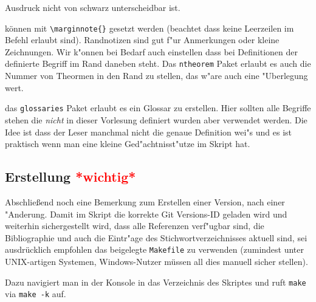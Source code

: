 \documentclass[paper=A4, twoside, chapterprefix=true, bibliography=totoc, headsepline]{scrbook}
\begin{document}
\begin{description}[font=\normalfont\itshape]
    Ausdruck nicht von schwarz unterscheidbar ist.
  \item[Randnotizen:] können mit \verb|\marginnote{}| gesetzt werden
    (beachtet dass keine Leerzeilen im Befehl erlaubt
    sind). Randnotizen sind gut f"ur Anmerkungen oder kleine
    Zeichnungen. Wir k"onnen bei Bedarf auch einstellen dass bei
    Definitionen der definierte Begriff im Rand daneben steht. Das
    \verb|ntheorem| Paket erlaubt es auch die Nummer von Theormen in
    den Rand zu stellen, das w"are auch eine "Uberlegung wert.
  \item[Glossareintr"age:] das \verb|glossaries| Paket erlaubt es ein
    Glossar zu erstellen. Hier sollten alle Begriffe stehen die
    \emph{nicht} in dieser Vorlesung definiert wurden aber verwendet
    werden. Die Idee ist dass der Leser manchmal nicht die genaue
    Definition wei"s und es ist praktisch wenn man eine kleine
    Ged"achtnisst"utze im Skript hat.
  \end{description}

  \subsection*{Erstellung \textcolor{red}{*wichtig*}}

  Abschließend noch eine Bemerkung zum Erstellen einer 
  Version, nach einer "Anderung. Damit im Skript die korrekte Git
  Versions-ID geladen wird und weiterhin sichergestellt wird, dass alle
  Referenzen verf"ugbar sind, die Bibliographie und auch die Eintr"age
  des Stichwortverzeichnisses aktuell sind, sei ausdrücklich empfohlen
  das beigelegte \verb|Makefile| zu verwenden (zumindest unter
  UNIX-artigen Systemen, Windows-Nutzer müssen all dies manuell sicher
  stellen).

  Dazu navigiert man in der Konsole in das Verzeichnis des Skriptes
  und ruft \verb|make| via \verb|make -k| auf.


    
    
    



  \appendix


  \renewcommand*{\othersectionlevelsformat}[3]{\ifstr{#1}{section}{\"Ubung\ #3\ vom\ }{#3\autodot\enskip}}
\end{document}
